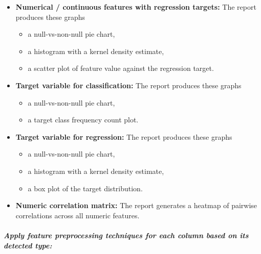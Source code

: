 \begin{itemize}
\begin{itemize}
    \end{itemize}
  \item \textbf{Numerical / continuous features with regression targets:} The report  produces these graphs
    \begin{itemize}
      \item a null-vs-non-null pie chart,
      \item a histogram with a kernel density estimate,
      \item a scatter plot of feature value against the regression target.
    \end{itemize}
  \item \textbf{Target variable for classification:} The report produces these graphs
    \begin{itemize}
      \item a null-vs-non-null pie chart,
      \item a target class frequency count plot.
    \end{itemize}
  \item \textbf{Target variable for regression:} The report produces these graphs
    \begin{itemize}
      \item a null-vs-non-null pie chart,
      \item a histogram with a kernel density estimate,
      \item a box plot of the target distribution.
    \end{itemize}
  \item \textbf{Numeric correlation matrix:} The report generates a heatmap of pairwise correlations across all numeric features.
\end{itemize}

\subparagraph{Apply feature preprocessing techniques for each column based on its detected type:}

